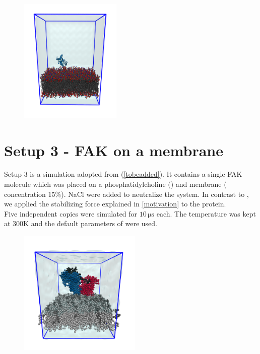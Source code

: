 \begin{figure}[h]
	\centering
	\includegraphics[height=6cm]{figures/setup/setup_umbrella}
	\label{setup:setup2_pic}
\end{figure}
%
%
%
\section{Setup 3 - FAK on a \pip{} membrane}
\label{setup:setup3}
Setup 3 is a \martini{} simulation adopted from \textcite{sara} (\autoref{tobeadded}). It contains a single FAK molecule which was placed on a phosphatidylcholine (\popc{}) and \pip{} membrane (\pip{} concentration $15\%$). NaCl were added to neutralize the system. In contrast to \textcite{sara}, we applied the stabilizing force explained in \autoref{motivation} to the protein.\\
Five independent copies were simulated for $10\,\si{\micro\second}$ each. The temperature was kept at $300\si{\kelvin}$ and the default parameters of \martini{} were used.
%
%
%
\begin{figure}[h]
	\centering
	\includegraphics[height=6cm]{figures/setup/setup_gen}
	\label{setup:setup3_pic}
\end{figure}
%
%
%

